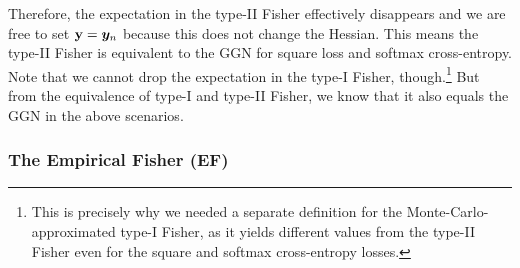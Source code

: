 Therefore, the expectation in the type-II Fisher effectively disappears and we are free to set ${\mathbf{y}} = {\bm{y}}_n$ because this does not change the Hessian.
This means the type-II Fisher is equivalent to the GGN for square loss and softmax cross-entropy.
Note that we cannot drop the expectation in the type-I Fisher, though.\footnote{This is precisely why we needed a separate definition for the Monte-Carlo-approximated type-I Fisher,
as it yields different values from the type-II Fisher even for the square and softmax cross-entropy losses.}
But from the equivalence of type-I and type-II Fisher, we know that it also equals the GGN in the above scenarios.

\subsubsection{The Empirical Fisher (EF)}\label{sec:emp_fisher}


